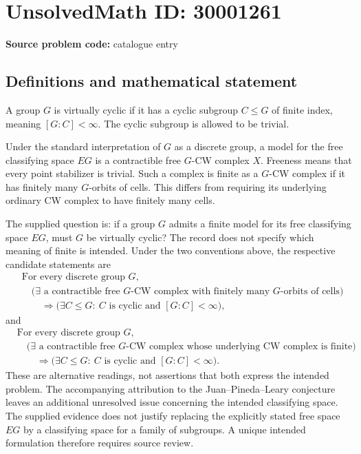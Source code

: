 \documentclass[11pt]{article}
\begin{document}
\section*{UnsolvedMath ID: 30001261}
\textbf{Source problem code:} catalogue entry
\subsection{Definitions and mathematical statement}
A group \(G\) is virtually cyclic if it has a cyclic subgroup \(C\leq G\) of finite index, meaning \([G:C]<\infty\). The cyclic subgroup is allowed to be trivial.

Under the standard interpretation of \(G\) as a discrete group, a model for the free classifying space \(EG\) is a contractible free \(G\)-CW complex \(X\). Freeness means that every point stabilizer is trivial. Such a complex is finite as a \(G\)-CW complex if it has finitely many \(G\)-orbits of cells. This differs from requiring its underlying ordinary CW complex to have finitely many cells.

The supplied question is: if a group \(G\) admits a finite model for its free classifying space \(EG\), must \(G\) be virtually cyclic? The record does not specify which meaning of finite is intended. Under the two conventions above, the respective candidate statements are
\[
\begin{aligned}
&\text{For every discrete group }G,\\
&\quad \bigl(\exists\text{ a contractible free }G\text{-CW complex with finitely many }G\text{-orbits of cells}\bigr)\\
&\qquad\Longrightarrow \bigl(\exists C\leq G:\ C\text{ is cyclic and }[G:C]<\infty\bigr),
\end{aligned}
\]
and
\[
\begin{aligned}
&\text{For every discrete group }G,\\
&\quad \bigl(\exists\text{ a contractible free }G\text{-CW complex whose underlying CW complex is finite}\bigr)\\
&\qquad\Longrightarrow \bigl(\exists C\leq G:\ C\text{ is cyclic and }[G:C]<\infty\bigr).
\end{aligned}
\]
These are alternative readings, not assertions that both express the intended problem. The accompanying attribution to the Juan--Pineda--Leary conjecture leaves an additional unresolved issue concerning the intended classifying space. The supplied evidence does not justify replacing the explicitly stated free space \(EG\) by a classifying space for a family of subgroups. A unique intended formulation therefore requires source review.
\end{document}
